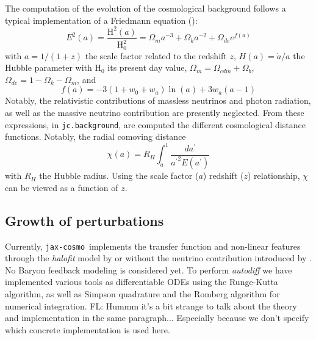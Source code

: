 \documentclass[twocolumn,twocolappendix,nofootinbib,iop]{openjournal}
\newcommand{\FrL}[1]{{\color{cyan}FL: #1}}
\newcommand{\JZ}[1]{{\color{purple}JZ: #1}}
\newcommand{\jaxcosmo}{\texttt{jax-cosmo}}
\begin{document}
The computation of the evolution of the cosmological background follows a typical implementation of a Friedmann equation (\citealp[see e.g.][]{2005A&A...443..819P}):
\begin{equation}
    E^2(a) = \frac{\mathrm{H}^2(a)}{\mathrm{H}^2_0} = \Omega_m a^{-3} + \Omega_k a^{-2} + \Omega_{de} e^{f(a)}
\end{equation}
with $a=1/(1+z)$ the scale factor related to the redshift $z$, $H(a)=\dot{a}/a$ the Hubble parameter with $\mathrm{H}_0$ its present day value, $\Omega_m= \Omega_{cdm}+\Omega_b$, $\Omega_{de}=1-\Omega_k-\Omega_m$, and 
\begin{equation}
    f(a) = -3 (1 + w_0 + w_a) \ln(a) + 3 w_a (a - 1)
\end{equation}
Notably, the relativistic contributions of massless neutrinos and photon radiation, as well as the massive neutrino contribution are presently neglected. From these expressions, in \texttt{jc.background}, are computed the different cosmological distance functions. Notably, the radial comoving distance
\begin{equation}
     \chi(a) =  R_H \int_a^1 \frac{da^\prime}{{a^\prime}^2 E(a^\prime)}
     \label{eq:radial_comoving}
\end{equation}
with $R_H$ the Hubble radius. Using the scale factor ($a$) redshift ($z$) relationship, $\chi$ can be viewed as a function of $z$. 
%
\subsection{Growth of perturbations}
%
Currently, \jaxcosmo\  implements the \citet{Eisenstein_1998} transfer function and non-linear features through the \textit{halofit} model by \cite{2012ApJ...761..152T} or \cite{2003MNRAS.341.1311S} without the neutrino contribution introduced by \cite{10.1111/j.1365-2966.2011.20222.x}. No Baryon feedback modeling is considered yet. To perform \textit{autodiff} we have implemented various tools as differentiable ODEs using the Runge-Kutta algorithm, as well as Simpson quadrature and the Romberg algorithm for numerical integration. \FrL{Hummm it's a bit strange to talk about the theory and implementation in the same paragraph... Especially because we don't specify which concrete implementation is used here.}

%
\end{document}
